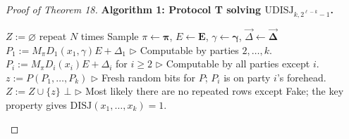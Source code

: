 \documentclass[10pt,a4paper]{article}
\newenvironment{authorclaim}[1]{\par\medskip\noindent\textbf{#1.}\ \ignorespaces}{\par\medskip}
\begin{document}
\begin{proof}[Proof of Theorem 18]
\begin{authorclaim}{Algorithm 1: Protocol T solving $\mathrm{UDISJ}_{k,2^{\ell-k}-1}$}
\begin{algorithmic}
\State $Z:=\varnothing$
\Loop\Statex repeat $N$ times
\State Sample $\pi\leftarrow\boldsymbol\pi$, $E\leftarrow\mathbf E$, $\gamma\leftarrow\boldsymbol\gamma$, $\vec\Delta\leftarrow\boldsymbol{\vec\Delta}$ 
\State $P_1:=M_\pi D_1(x_1,\gamma)E+\Delta_1$
\Statex $\triangleright$ Computable by parties $2,\ldots,k$.
\State $P_i:=M_\pi D_i(x_i)E+\Delta_i$ for $i\ge2$
\Statex $\triangleright$ Computable by all parties except $i$.
\State $z:=P(P_1,\ldots,P_k)$
\Statex $\triangleright$ Fresh random bits for $P$; $P_i$ is on party $i$'s forehead.
\State $Z:=Z\cup\{z\}$
\EndLoop
{}\State \Return $\bot$
\State {}
\Statex $\triangleright$ Most likely there are no repeated rows except Fake; the key property gives $\mathrm{DISJ}(x_1,\ldots,x_k)=1$.
\EndIf
\State {}
\end{algorithmic}
\end{authorclaim}

\end{proof}
\end{document}
